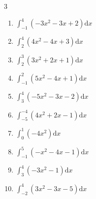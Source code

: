 \begin{multicols}{3}
\begin{enumerate}

  \item $\displaystyle \int_{-1}^{4}\left( -3x^{2}-3x+2 \right) \mathrm{d}x$


  \item $\displaystyle \int_{2}^{4}\left( 4x^{2}-4x+3 \right) \mathrm{d}x$


\columnbreak %

\resetques

  \item $\displaystyle \int_{2}^{3}\left( 3x^{2}+2x+1 \right) \mathrm{d}x$


  \item $\displaystyle \int_{-1}^{2}\left( 5x^{2}-4x+1 \right) \mathrm{d}x$


  \item $\displaystyle \int_{3}^{4}\left( -5x^{2}-3x-2 \right) \mathrm{d}x$


  \item $\displaystyle \int_{-5}^{-4}\left( 4x^{2}+2x-1 \right) \mathrm{d}x$


  \item $\displaystyle \int_{0}^{1}\left( -4x^{2} \right) \mathrm{d}x$


\columnbreak %

  \item $\displaystyle \int_{-1}^{5}\left( -x^{2}-4x-1 \right) \mathrm{d}x$

        \phantom{$\displaystyle =-91$}

  \item $\displaystyle \int_{3}^{4}\left( -3x^{2}-1 \right) \mathrm{d}x$


  \item $\displaystyle \int_{-2}^{4}\left( 3x^{2}-3x-5 \right) \mathrm{d}x$


\end{enumerate}
\end{multicols}
